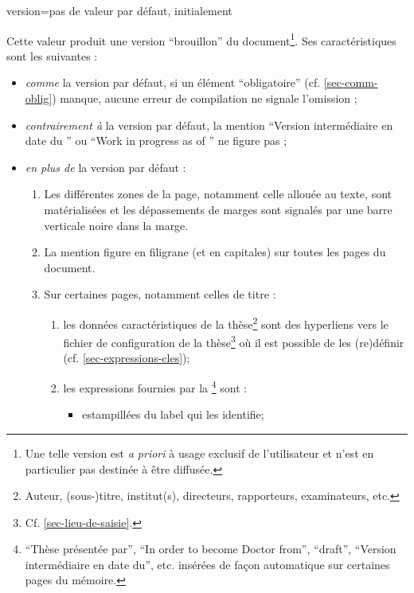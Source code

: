 {\begin{docKey}{version}{=\textbar{}\textbar{}\textbar{}\textbar{}\textbar{}}{pas
      de valeur par défaut, initialement }
\begin{description}
      Cette valeur produit une version
      \enquote{brouillon} du document\footnote{Une telle version est \emph{a
          priori} à usage exclusif de l'utilisateur et n'est en particulier pas
        destinée à être diffusée.}. Ses caractéristiques sont les suivantes :
      \begin{itemize}
      \item \emph{comme} la version par défaut, si un élément
        \enquote{obligatoire} (cf. \vref{sec-comm-oblig}) manque, aucune erreur
        de compilation ne signale l'omission ;
      \item \emph{contrairement à} la version par défaut, la mention
        \enquote{Version intermédiaire en date du } ou
        \foreignquote{english}{Work in progress as of } ne
        figure pas ;
      \item \emph{en plus de} la version par défaut :
        \begin{enumerate}
        \item Les différentes zones de la page, notamment celle allouée au
          texte, sont matérialisées et les dépassements de marges sont signalés
          par une barre verticale noire dans la marge.
        \item La mention  figure en
          filigrane (et en capitales) sur toutes les pages du
          document.
        \item Sur certaines pages, notamment celles de titre :
          \begin{enumerate}
          \item les données caractéristiques de la thèse\footnote{Auteur,
              (sous-)titre, institut(s), directeurs, rapporteurs, examinateurs,
              etc.} sont des hyperliens vers le fichier de configuration de la
            thèse\footnote{Cf. \vref{sec-lieu-de-saisie}.} où il est possible de
            les (re)définir (cf. \vref{sec-expressions-cles});
          \item\label{item-expression} les expressions fournies par la
            \yatCl\footnote{\enquote{Thèse présentée par},
              \foreignquote{english}{In order to become Doctor from},
              \foreignquote{english}{draft}, \enquote{Version intermédiaire en
                date du}, etc. insérées de façon automatique sur certaines pages
              du mémoire.} sont :
            \begin{itemize}
            \item estampillées du label qui les identifie;

\end{itemize}
\end{enumerate}
\end{enumerate}
\end{itemize}
\end{description}
\end{docKey}}
